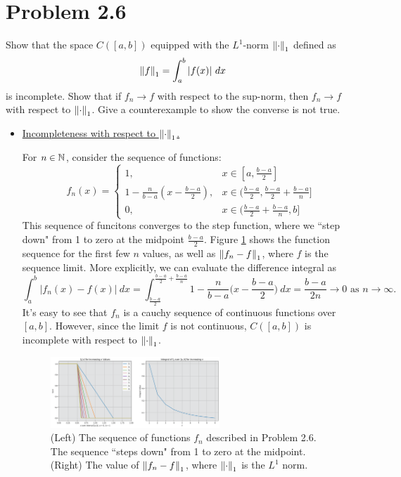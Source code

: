 \section{Problem 2.6}
Show that the space $C([a, b])$ equipped with the $L^1$-norm $\norm{\cdot}_1$ defined as 
\[\norm{f}_1 = \int_a^b |f(x)| \ dx\]
is incomplete. Show that if $f_n \rightarrow f$ with respect to the sup-norm, then $f_n \rightarrow f$ with respect to $\norm{\cdot}_1$. Give a counterexample to show the converse is not true.
\partbreak
\begin{solution}

    \begin{itemize}[-]
        \item \underline{Incompleteness with respect to $\norm{\cdot}_1$.}

        \jump
        For $n \in \mathbb{N}$, consider the sequence of functions:
        \[
        f_n(x) = \begin{cases}
            1, & x \in [a, \frac{b - a}{2}]\\
            1 - \frac{n}{b - a}(x - \frac{b - a}{2}), &x \in (\frac{b - a}{2},  \frac{b - a}{2} + \frac{b - a}{n}]\\
            0, & x \in (\frac{b - a}{2} + \frac{b - a}{n}, b]
        \end{cases}
        \]
        This sequence of funcitons converges to the step function, where we ``step down" from 1 to zero at the midpoint $\frac{b -a}{2}$. Figure \ref{fig:p2.6.1} shows the function sequence for the first few $n$ values, as well as $\norm{f_n - f}_1$, where $f$ is the sequence limit. More explicitly, we can evaluate the difference integral as 
        \[
        \int_a^b |f_n(x) - f(x)| \ dx = \int_{\frac{b - a}{2}}^{\frac{b - a}{2} + \frac{b - a}{n}} 1 - \frac{n}{b - a} \Big(x - \frac{b - a}{2}\Big) \ dx = \frac{b - a}{2n} \rightarrow 0 \text{ as } n \rightarrow \infty. 
        \]
        It's easy to see that $f_n$ is a cauchy sequence of continuous functions over $[a, b]$. However, since the limit $f$ is not continuous, $C([a, b])$ is incomplete with respect to $\norm{\cdot}_1$. 
        

        \begin{figure}[!h]
            \centering
            \includegraphics[width = 0.6\textwidth]{Images/Problem2.6.1.png}
            \caption{(Left) The sequence of functions $f_n$ described in Problem 2.6. The sequence ``steps down" from 1 to zero at the midpoint. (Right) The value of $\norm{f_n - f}_1$, where $\norm{\cdot}_1$ is the $L^1$ norm.}
            \label{fig:p2.6.1}
        \end{figure}


\end{itemize}
\end{solution}
